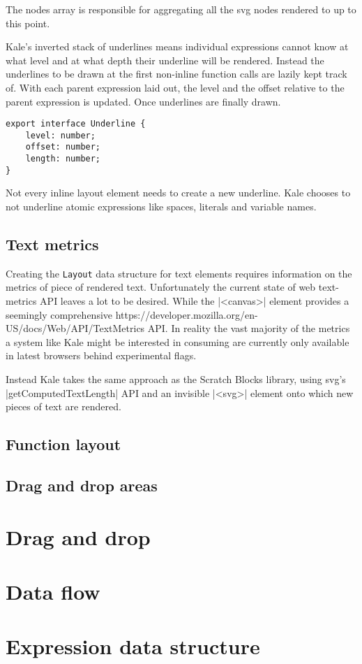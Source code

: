  The nodes array is responsible for aggregating all the
\ac{svg} nodes rendered to up to this point.

 Kale's inverted stack of underlines means individual
expressions cannot know at what level and at what depth their underline will
be rendered. Instead the underlines to be drawn at the first non-inline
function calls are lazily kept track of. With each parent expression laid
out, the level and the offset relative to the parent expression is updated.
Once underlines are finally drawn.

\begin{Verbatim}[samepage]
export interface Underline {
    level: number;
    offset: number;
    length: number;
}
\end{Verbatim}



 Not every inline layout element needs to create
a new underline. Kale
chooses to not underline atomic expressions like spaces, literals and variable
names.




\subsection{Text metrics}

Creating the \texttt{Layout} data structure for text elements requires
information on the metrics of piece of rendered text. Unfortunately the current
state of web text-metrics API leaves a lot to be desired. While
the |<canvas>| element provides a seemingly comprehensive
{https://developer.mozilla.org/en-US/docs/Web/API/TextMetrics} API.
In reality the vast majority of the metrics a system like Kale might
be interested in consuming are currently only available in latest
browsers behind experimental flags.


Instead Kale takes the same approach as the Scratch Blocks \cite{ScratchBlocks}
library, using \ac{svg}'s |getComputedTextLength| API and an invisible
|<svg>| element onto which new pieces of text are rendered. 

\subsection{Function layout}
\subsection{Drag and drop areas}
\section{Drag and drop}
\section{Data flow}
\section{Expression data structure}